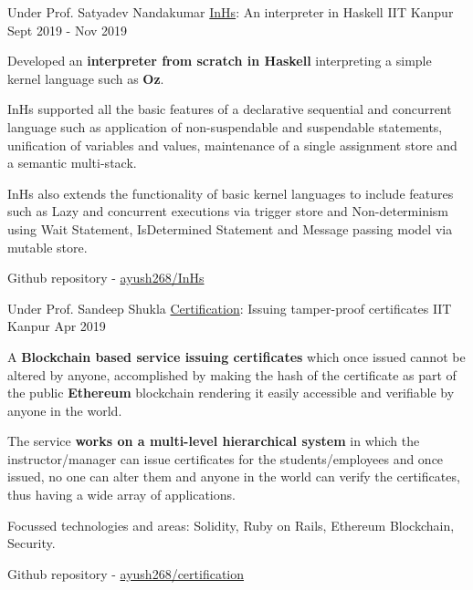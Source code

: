\begin{cventries}

  \cventry
    {Under Prof. Satyadev Nandakumar} %
    {\href{https://github.com/ayush268/InHs}{InHs}: An interpreter in Haskell} %
    {IIT Kanpur} %
    {Sept 2019 - Nov 2019} %
    {
      \begin{cvitems} %
      \item {Developed an \textbf{interpreter from scratch in Haskell} interpreting a simple kernel language such as \textbf{Oz}.}
      \item {InHs supported all the basic features of a declarative sequential and concurrent language such as application of non-suspendable and suspendable statements, unification of variables and values, maintenance of a single assignment store and a semantic multi-stack.}
      \item {InHs also extends the functionality of basic kernel languages to include features such as Lazy and concurrent executions via trigger store and Non-determinism using Wait Statement, IsDetermined Statement and Message passing model via mutable store.}
      \item {Github repository - \href{https://github.com/ayush268/InHs}{ayush268/InHs}}
      \end{cvitems}
    }%


  \cventry
    {Under Prof. Sandeep Shukla} %
    {\href{https://github.com/ayush268/certification}{Certification}: Issuing tamper-proof certificates} %
    {IIT Kanpur} %
    {Apr 2019} %
    {
      \begin{cvitems} %
        \item {A \textbf{Blockchain based service issuing certificates} which once issued cannot be altered by anyone, accomplished by making the hash of the certificate as part of the public \textbf{Ethereum} blockchain rendering it easily accessible and verifiable by anyone in the world.}
        \item {The service \textbf{works on a multi-level hierarchical system} in which the instructor/manager can issue certificates for the students/employees and once issued, no one can alter them and anyone in the world can verify the certificates, thus having a wide array of applications.}
        \item {Focussed technologies and areas: Solidity, Ruby on Rails, Ethereum Blockchain, Security.}
        \item {Github repository - \href{https://github.com/ayush268/certification}{ayush268/certification}}
      \end{cvitems}
    }


\end{cventries}
